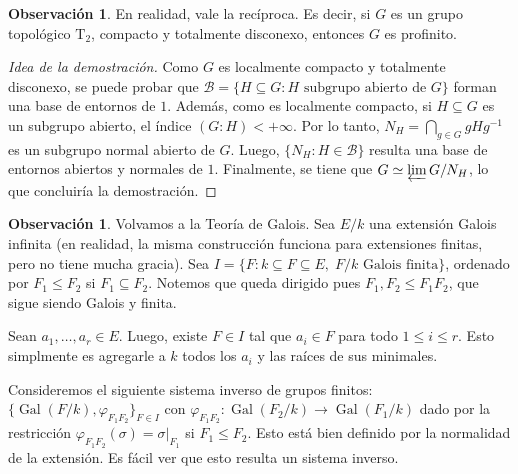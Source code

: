 \documentclass[12pt]{book}
\theoremstyle{definition}
\newtheorem{obs}[teo]{Observación}
\DeclareMathOperator{\Gal}{Gal}
\begin{document}
\begin{obs}
En realidad, vale la recíproca. Es decir, si $G$ es un grupo topológico $\mathrm{T}_2$, compacto y totalmente disconexo, entonces $G$ es profinito.
\begin{proof}[Idea de la demostración]
Como $G$ es localmente compacto y totalmente disconexo, se puede probar que $\mathscr{B}=\{H\subseteq G : H\text{ subgrupo abierto de }G\}$ forman una base de entornos de $1$. Además, como es localmente compacto, si $H\subseteq G$ es un subgrupo abierto, el índice $(G:H)<+\infty$. Por lo tanto, $N_H = \displaystyle\bigcap_{g\in G} gHg^{-1}$ es un subgrupo normal abierto de $G$. Luego, $\{N_H : H\in\mathscr{B}\}$ resulta una base de entornos abiertos y normales de $1$. Finalmente, se tiene que $G\simeq \varprojlim G/N_H$, lo que concluiría la demostración.
\end{proof}
\end{obs}

\begin{obs}
Volvamos a la Teoría de Galois. Sea $E/k$ una extensión Galois infinita (en realidad, la misma construcción funciona para extensiones finitas, pero no tiene mucha gracia). Sea $I=\{F : k\subseteq F\subseteq E, \; F/k\text{ Galois finita}\}$, ordenado por $F_1\leq F_2$ si $F_1\subseteq F_2$. Notemos que queda dirigido pues $F_1,F_2\leq F_1F_2$, que sigue siendo Galois y finita.

Sean $a_1,\ldots , a_r\in E$. Luego, existe $F\in I$ tal que $a_i\in F$ para todo $1\leq i\leq r$. Esto simplmente es agregarle a $k$ todos los $a_i$ y las raíces de sus minimales.

Consideremos el siguiente sistema inverso de grupos finitos: $\{\Gal(F/k),\varphi_{F_1F_2}\}_{F\in I}$ con $\varphi_{F_1F_2}:\Gal(F_2/k)\to \Gal(F_1/k)$ dado por la restricción $\varphi_{F_1F_2}(\sigma) = \left.\sigma\right|_{F_1}$ si $F_1\leq F_2$. Esto está bien definido por la normalidad de la extensión. Es fácil ver que esto resulta un sistema inverso.
\end{obs}
\end{document}
